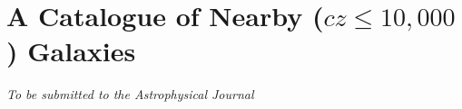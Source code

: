 \chapter[A Catalogue of Nearby ($cz \leq 10,000$ \kms) Galaxies]{A Catalogue of Nearby ($cz \leq 10,000$ \kms) Galaxies} 
\label{chap:chap2}


\vspace*{\fill}






\vspace*{\fill}


\begin{flushright}
  \fixspacing %
  \textit{To be submitted to the \emph{Astrophysical Journal}} \\
\end{flushright}

\vspace*{1in} %

\cleardoublepage


%
%
%
%
%
%
%
%
%
%
%
%
%
%


